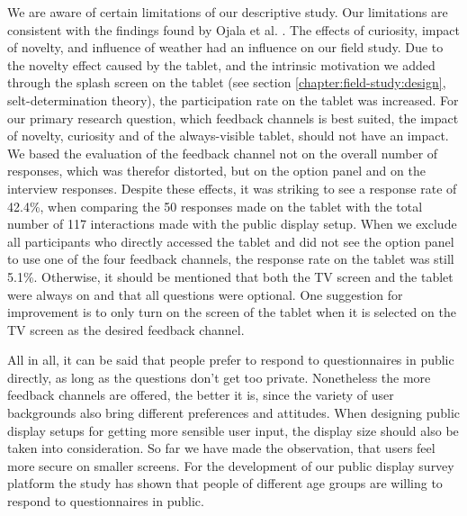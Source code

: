 	We are aware of certain limitations of our descriptive study. Our limitations are consistent with the findings found by Ojala et al. \cite{Ojala2011}. The effects of curiosity, impact of novelty, and influence of weather had an influence on our field study. Due to the novelty effect caused by the tablet, and the intrinsic motivation we added through the splash screen on the tablet (see section \ref{chapter:field-study:design}, selt-determination theory), the participation rate on the tablet was increased. For our primary research question, which feedback channels is best suited, the impact of novelty, curiosity and of the always-visible tablet, should not have an impact. We based the evaluation of the feedback channel not on the overall number of responses, which was therefor distorted, but on the option panel and on the interview responses.
	Despite these effects, it was striking to see a response rate of 42.4\%, when comparing the 50 responses made on the tablet with the total number of 117 interactions made with the public display setup. When we exclude all participants who directly accessed the tablet and did not see the option panel to use one of the four feedback channels, the response rate on the tablet was still 5.1\%. 
	Otherwise, it should be mentioned that both the TV screen and the tablet were always on and that all questions were optional. One suggestion for improvement is to only turn on the screen of the tablet when it is selected on the TV screen as the desired feedback channel.

	All in all, it can be said that people prefer to respond to questionnaires in public directly, as long as the questions don't get too private. Nonetheless the more feedback channels are offered, the better it is, since the variety of user backgrounds also bring different preferences and attitudes. When designing public display setups for getting more sensible user input, the display size should also be taken into consideration. So far we have made the observation, that users feel more secure on smaller screens.
	For the development of our public display survey platform the study has shown that people of different age groups are willing to respond to questionnaires in public. 










